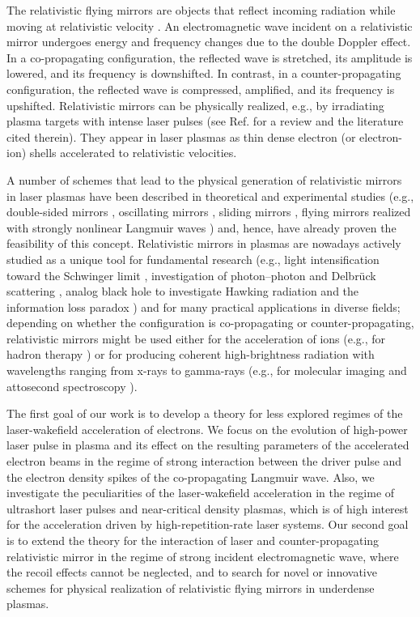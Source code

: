 \documentclass[10pt, a4paper, twoside, openright]{report}
\begin{document}
The relativistic flying mirrors are objects that reflect incoming radiation while moving at relativistic velocity \cite{Einstein1905}. An electromagnetic wave incident on a relativistic mirror undergoes energy and frequency changes due to the double Doppler effect. In a co-propagating configuration, the reflected wave is stretched, its amplitude is lowered, and its frequency is downshifted. In contrast, in a counter-propagating configuration, the reflected wave is compressed, amplified, and its frequency is upshifted. Relativistic mirrors can be physically realized, e.g., by irradiating plasma targets with intense laser pulses (see Ref.  for a review and the literature cited therein). They appear in laser plasmas as thin dense electron (or electron-ion) shells accelerated to relativistic velocities. 

A number of schemes that lead to the physical generation of relativistic mirrors in laser plasmas have been described in theoretical and experimental studies (e.g., double-sided mirrors \cite{Kulagin2007a, Esirkepov2009, Wu2010, Kiefer2013, Ma2014}, oscillating mirrors \cite{Bulanov1994, Lichters1996, Naumova2004, Wheeler2012, Vincenti2019}, sliding mirrors \cite{Pirozhkov2006}, flying mirrors realized with strongly nonlinear Langmuir waves \cite{Bulanov2003, Kando2007, Pirozhkov2007, Kando2009}) and, hence, have already proven the feasibility of this concept. Relativistic mirrors in plasmas are nowadays actively studied as a unique tool for fundamental research (e.g., light intensification toward the Schwinger limit \cite{Bulanov2003}, investigation of photon–photon and Delbrück scattering \cite{Koga2012, Koga2018}, analog black hole to investigate Hawking radiation and the information loss paradox \cite{Chen2017, Chen2020}) and for many practical applications in diverse fields; depending on whether the configuration is co-propagating or counter-propagating, relativistic mirrors might be used either for the acceleration of ions (e.g., for hadron therapy \cite{Bulanov2002}) or for producing coherent high-brightness radiation with wavelengths ranging from x-rays to gamma-rays (e.g., for molecular imaging \cite{Neutze2000} and attosecond spectroscopy \cite{Krausz2009}).

The first goal of our work is to develop a theory for less explored regimes of the laser-wakefield acceleration of electrons. We focus on the evolution of high-power laser pulse in plasma and its effect on the resulting parameters of the accelerated electron beams in the regime of strong interaction between the driver pulse and the electron density spikes of the co-propagating Langmuir wave. Also, we investigate the peculiarities of the laser-wakefield acceleration in the regime of ultrashort laser pulses and near-critical density plasmas, which is of high interest for the acceleration driven by high-repetition-rate laser systems. Our second goal is to extend the theory for the interaction of laser and counter-propagating relativistic mirror in the regime of strong incident electromagnetic wave, where the recoil effects cannot be neglected, and to search for novel or innovative schemes for physical realization of relativistic flying mirrors in underdense plasmas.
\end{document}

